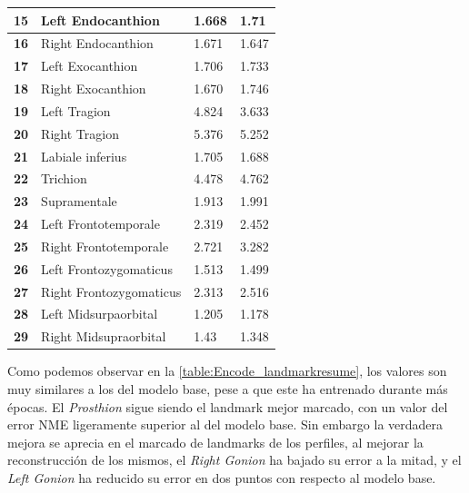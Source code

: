 \begin{table}[!ht]
\begin{tabular}{|l|l|l|l|}
                    \textbf{15} & Left Endocanthion & \cellcolor{green!25} 1.668 & 1.71 \\ \hline
                    \textbf{16} & Right Endocanthion & 1.671 & \cellcolor{green!25} 1.647 \\ \hline
                    \textbf{17} & Left Exocanthion & \cellcolor{green!25} 1.706 & 1.733 \\ \hline
                    \textbf{18} & Right Exocanthion & \cellcolor{green!25} 1.670 & 1.746 \\ \hline
                    \textbf{19} & Left Tragion & 4.824 & \cellcolor{green!25} 3.633 \\ \hline
                    \textbf{20} & Right Tragion & 5.376 & \cellcolor{green!25} 5.252 \\ \hline
                    \textbf{21} & Labiale inferius & 1.705 & \cellcolor{green!25} 1.688 \\ \hline
                    \textbf{22} & Trichion & \cellcolor{green!25} 4.478 & 4.762 \\ \hline
                    \textbf{23} & Supramentale & \cellcolor{green!25} 1.913 & 1.991 \\ \hline
                    \textbf{24} & Left Frontotemporale & \cellcolor{green!25} 2.319 & 2.452 \\ \hline
                    \textbf{25} & Right Frontotemporale & \cellcolor{green!25} 2.721 & 3.282 \\ \hline
                    \textbf{26} & Left Frontozygomaticus & 1.513 & \cellcolor{green!25} 1.499 \\ \hline
                    \textbf{27} & Right Frontozygomaticus & \cellcolor{green!25} 2.313 & 2.516 \\ \hline
                    \textbf{28} & Left Midsurpaorbital & 1.205 & \cellcolor{green!25} 1.178 \\ \hline
                    \textbf{29} & Right Midsupraorbital & 1.43 & \cellcolor{green!25} 1.348 \\ \hline
                \end{tabular}
                \label{table:Encode_landmarkresume}
            \end{table}    

    \noindent Como podemos observar en la \autoref{table:Encode_landmarkresume}, los valores son muy similares a los del modelo base, pese a que este ha entrenado durante más épocas. El \textit{Prosthion} sigue siendo el landmark mejor marcado, con un valor del error NME ligeramente superior al del modelo base. Sin embargo la verdadera mejora se aprecia en el marcado de landmarks de los perfiles, al mejorar la reconstrucción de los mismos, el \textit{Right Gonion} ha bajado su error a la mitad, y el \textit{Left Gonion} ha reducido su error en dos puntos con respecto al modelo base.
    
